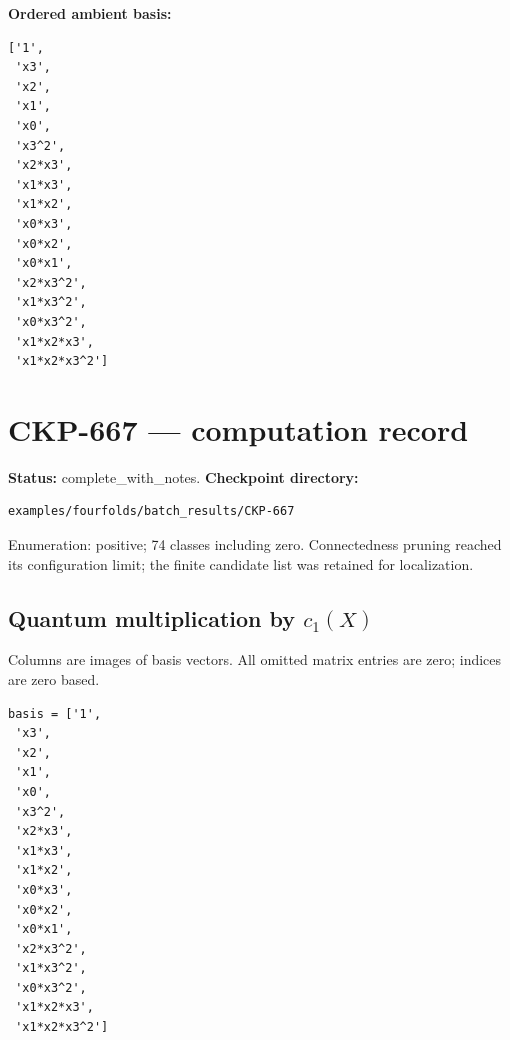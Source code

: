 \documentclass[10pt,a4paper]{article}
\begin{document}
\textbf{Ordered ambient basis:}
\begin{lstlisting}
['1',
 'x3',
 'x2',
 'x1',
 'x0',
 'x3^2',
 'x2*x3',
 'x1*x3',
 'x1*x2',
 'x0*x3',
 'x0*x2',
 'x0*x1',
 'x2*x3^2',
 'x1*x3^2',
 'x0*x3^2',
 'x1*x2*x3',
 'x1*x2*x3^2']
\end{lstlisting}

\clearpage\section*{CKP-667 --- computation record}
\textbf{Status:} complete\_with\_notes.
\textbf{Checkpoint directory:}
\begin{lstlisting}
examples/fourfolds/batch_results/CKP-667
\end{lstlisting}

Enumeration: positive; 74 classes including zero.
Connectedness pruning reached its configuration limit; the finite candidate list was retained for localization.
\subsection*{Quantum multiplication by $c_1(X)$}
Columns are images of basis vectors. All omitted matrix entries are zero; indices are zero based.

\begin{lstlisting}
basis = ['1',
 'x3',
 'x2',
 'x1',
 'x0',
 'x3^2',
 'x2*x3',
 'x1*x3',
 'x1*x2',
 'x0*x3',
 'x0*x2',
 'x0*x1',
 'x2*x3^2',
 'x1*x3^2',
 'x0*x3^2',
 'x1*x2*x3',
 'x1*x2*x3^2']
\end{lstlisting}
\end{document}
